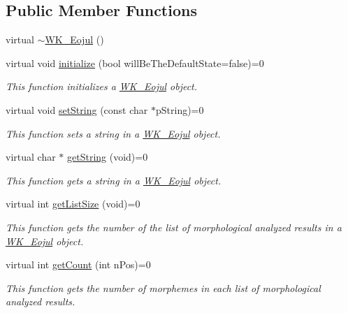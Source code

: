 \subsection*{Public Member Functions}
\begin{CompactItemize}
\item 
virtual \hyperlink{classWK__Eojul_ea467188fd903acf353d8bdf586196de}{$\sim$WK\_\-Eojul} ()
\item 
virtual void \hyperlink{classWK__Eojul_0a47e3d87115a85868ed5b3cfecc6787}{initialize} (bool willBeTheDefaultState=false)=0
\begin{CompactList}\small\item\em This function initializes a \hyperlink{classWK__Eojul}{WK\_\-Eojul} object. \item\end{CompactList}\item 
virtual void \hyperlink{classWK__Eojul_ddb3f1626f2dd6f0dc4bcfe8de43fd05}{setString} (const char $\ast$pString)=0
\begin{CompactList}\small\item\em This function sets a string in a \hyperlink{classWK__Eojul}{WK\_\-Eojul} object. \item\end{CompactList}\item 
virtual char $\ast$ \hyperlink{classWK__Eojul_ac9caae5a102114862eb398994596fbf}{getString} (void)=0
\begin{CompactList}\small\item\em This function gets a string in a \hyperlink{classWK__Eojul}{WK\_\-Eojul} object. \item\end{CompactList}\item 
virtual int \hyperlink{classWK__Eojul_3c0cccef5359472075e758274f716720}{getListSize} (void)=0
\begin{CompactList}\small\item\em This function gets the number of the list of morphological analyzed results in a \hyperlink{classWK__Eojul}{WK\_\-Eojul} object. \item\end{CompactList}\item 
virtual int \hyperlink{classWK__Eojul_ebb07e0b90314607d6742517a6de6fbd}{getCount} (int nPos)=0
\begin{CompactList}\small\item\em This function gets the number of morphemes in each list of morphological analyzed results. \item\end{CompactList}\item 

\end{CompactItemize}
